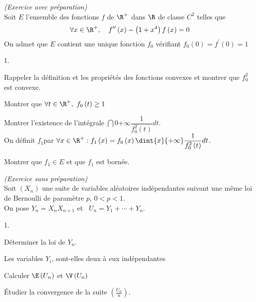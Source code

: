 \documentclass[11pt]{article}%
\begin{document}


\begin{exercice}{\it (Exercice avec préparation)}~\\
  Soit $E$ l'ensemble des fonctions $f$ de $\R^{+}$ dans $\R$ de
  classe $C^{2}$ telles que
  \[
  \forall x\in \R^{+},\quad f^{\prime \prime }\left( x\right) -\left(
    1+x^{4}\right) f\left( x\right) =0
  \]
  On admet que $E$ contient une unique fonction $f_{0}$ vérifiant $%
  f_{0}\left( 0\right) =f^{\prime }\left( 0\right) =1$

  \begin{noliste}{1.}
  \item Rappeler la définition et les propriétés des fonctions
    convexes et montrer que $f_{0}^{2}$ est convexe.

  \item Montrer que $\forall t\in \R^{+},\ f_{0}\left( t\right) \geq 1$

  \item Montrer l'existence de l'intégrale $\dint{0}{+\infty
    }\dfrac{1}{ f_{0}^{2}\left( t\right) }dt$.\\[.2cm]
    On définit $f_{1}$par $\forall x\in \R^{+}:f_{1}\left( x\right)
    =f_{0}\left( x\right) \dint{x}{+\infty }\dfrac{1}{f_{0}^{2}\left(
        t\right) }dt$.

  \item Montrer que $f_{1}\in E$ et que $f_{1}$ est bornée.
  \end{noliste}
\end{exercice}

\addtocounter{exercice}{-1}
\begin{exercice}{\it (Exercice sans préparation)}~\\
  Soit $\left( X_{n}\right) $ une suite de variables aléatoires
  indépendantes suivant une même loi de Bernoulli de paramètre $p$,
  $0<p<1$.\\
  On pose $Y_{n}=X_{n}X_{n+1}$ et \ $U_{n}=Y_{1}+\cdots +Y_{n}$.
  \begin{noliste}{1.}
  \item Déterminer la loi de $Y_{n}$.
  \item Les variables $Y_{i}$, sont-elles deux à eux indépendantes
  \item Calculer $\E\left( U_n\right) $ et $\V\left( U_{n}\right) $
  \item Étudier la convergence de la suite $\left(
      \frac{U_{n}}{n}\right) $.
  \end{noliste}
\end{exercice}
\end{document}
